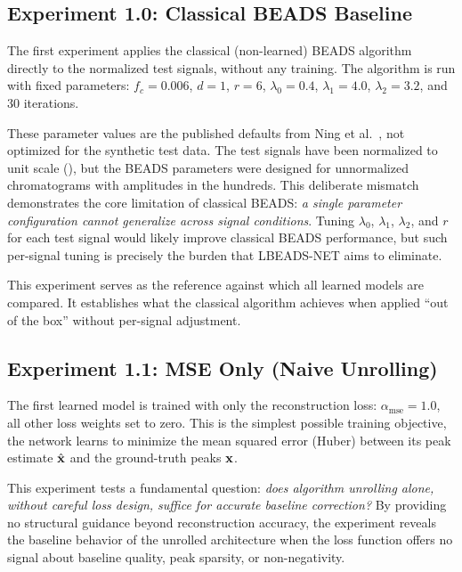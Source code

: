 \subsection{Experiment 1.0: Classical BEADS Baseline}
\label{sec:exp_1_0}

The first experiment applies the classical (non-learned) BEADS algorithm directly to the normalized test signals, without any training. The algorithm is run with fixed parameters: $f_c = 0.006$, $d = 1$, $r = 6$, $\lambda_0 = 0.4$, $\lambda_1 = 4.0$, $\lambda_2 = 3.2$, and 30 iterations.

These parameter values are the published defaults from Ning et al.~\cite{ning2014beads}, not optimized for the synthetic test data. The test signals have been normalized to unit scale (), but the BEADS parameters were designed for unnormalized chromatograms with amplitudes in the hundreds. This deliberate mismatch demonstrates the core limitation of classical BEADS: \emph{a single parameter configuration cannot generalize across signal conditions}. Tuning $\lambda_0$, $\lambda_1$, $\lambda_2$, and $r$ for each test signal would likely improve classical BEADS performance, but such per-signal tuning is precisely the burden that LBEADS-NET aims to eliminate.

This experiment serves as the reference against which all learned models are compared. It establishes what the classical algorithm achieves when applied ``out of the box'' without per-signal adjustment.


\subsection{Experiment 1.1: MSE Only (Naive Unrolling)}
\label{sec:exp_1_1}

The first learned model is trained with only the reconstruction loss: $\alpha_{\text{mse}} = 1.0$, all other loss weights set to zero. This is the simplest possible training objective, the network learns to minimize the mean squared error (Huber) between its peak estimate $\hat{\mathbf{x}}$ and the ground-truth peaks $\mathbf{x}$.

This experiment tests a fundamental question: \emph{does algorithm unrolling alone, without careful loss design, suffice for accurate baseline correction?} By providing no structural guidance beyond reconstruction accuracy, the experiment reveals the baseline behavior of the unrolled architecture when the loss function offers no signal about baseline quality, peak sparsity, or non-negativity.


